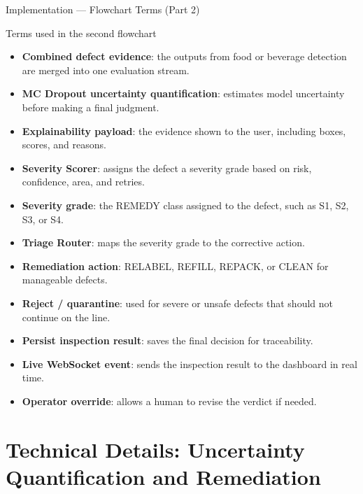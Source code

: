 \documentclass[10pt]{beamer}
\begin{document}
\begin{frame}[t]{Implementation --- Flowchart Terms (Part 2)}

\footnotesize
\begin{block}{Terms used in the second flowchart}
\begin{itemize}\setlength{\itemsep}{1.5pt}
    \item \textbf{Combined defect evidence}: the outputs from food or beverage detection are merged into one evaluation stream.
    \item \textbf{MC Dropout uncertainty quantification}: estimates model uncertainty before making a final judgment.
    \item \textbf{Explainability payload}: the evidence shown to the user, including boxes, scores, and reasons.
    \item \textbf{Severity Scorer}: assigns the defect a severity grade based on risk, confidence, area, and retries.
    \item \textbf{Severity grade}: the REMEDY class assigned to the defect, such as S1, S2, S3, or S4.
    \item \textbf{Triage Router}: maps the severity grade to the corrective action.
    \item \textbf{Remediation action}: RELABEL, REFILL, REPACK, or CLEAN for manageable defects.
    \item \textbf{Reject / quarantine}: used for severe or unsafe defects that should not continue on the line.
    \item \textbf{Persist inspection result}: saves the final decision for traceability.
    \item \textbf{Live WebSocket event}: sends the inspection result to the dashboard in real time.
    \item \textbf{Operator override}: allows a human to revise the verdict if needed.
\end{itemize}
\end{block}

\end{frame}



\section{Technical Details: Uncertainty Quantification and Remediation}
\end{document}
